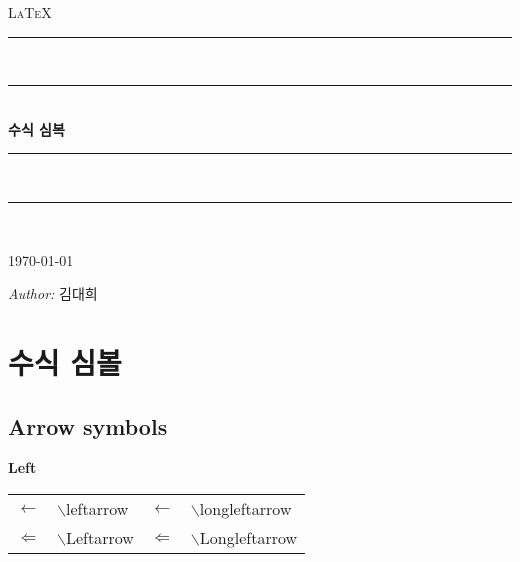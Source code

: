 \documentclass[12pt,a4paper]{report}
\begin{document}
		\begin{titlepage}
		\singlespace
		\pagestyle{empty}
		\newcommand{\HRule}{\rule{\textwidth}{0.5mm}}
		\begin{center}
		\null
		\vspace{2cm}
		\textsc{\LARGE \LaTeX }\\[1.0cm]
		\HRule\\[-0.4cm]
		\HRule \\[0.4cm]
			{ \huge \bfseries 수식 심복 \\[0.4cm] }
		\HRule\\[-0.4cm]
		\HRule \\[1.5cm]
		
		\noindent
		\begin{minipage}{1\textwidth}
			\begin{flushright} \large \today	\end{flushright}
			\begin{flushright} \large \emph{Author:}  김대희	\end{flushright}

		\end{minipage}%
		\vfill
		
		\end{center}
		\cleardoublepage
		\end{titlepage}																						

		\listoffigures
		\listoftables
		
		
		
\newpage
\chapter{수식 심볼}
		

%
%
%
\clearpage
\section{Arrow symbols}

			\textbf{Left}\\
			\begin{tabular}{ p{} p{} 
							p{} p{}  }
			\toprule
			$\leftarrow$		&$\backslash$leftarrow &
			$\longleftarrow$	&$\backslash$longleftarrow \\
			$\Leftarrow$		&$\backslash$Leftarrow&
			$\Longleftarrow$	&$\backslash$Longleftarrow \\
			\bottomrule
			\end{tabular} \\
			
\end{document}
